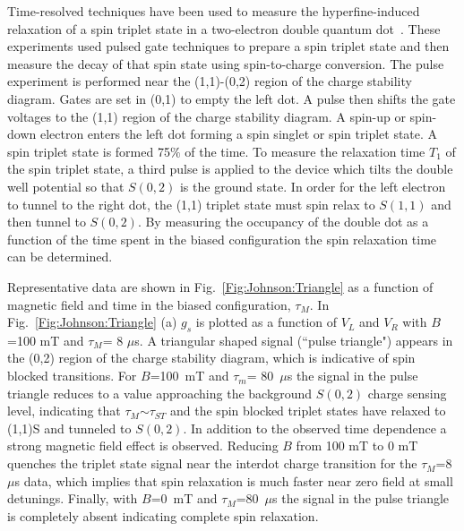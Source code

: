 \documentclass[12pt,aps,nofootinbib]{revtex4-1}
\begin{document}
Time-resolved techniques have been used to measure the hyperfine-induced relaxation
of a spin triplet state in a two-electron double quantum
dot~\cite{Petta_ST,johnson05}. These experiments used pulsed gate
techniques to prepare a spin triplet state and then measure the
decay of that spin state using spin-to-charge conversion. The
pulse experiment is performed near the (1,1)-(0,2) region of the
charge stability diagram. Gates are set in (0,1) to empty the left
dot. A pulse then shifts the gate voltages to the (1,1) region of
the charge stability diagram. A spin-up or spin-down electron
enters the left dot forming a spin singlet or spin triplet state.
A spin triplet state is formed 75$\%$ of the time. To measure the relaxation time $T_1$ of the spin triplet state, a
third pulse is applied to the device which tilts the double well
potential so that $S(0,2)$ is the ground state. In order for the
left electron to tunnel to the right dot, the (1,1) triplet state
must spin relax to $S(1,1)$ and then tunnel to $S(0,2)$. By
measuring the occupancy of the double dot as a function of the
time spent in the biased configuration the spin relaxation time can be
determined.

Representative data are shown in Fig.\ \ref{Fig:Johnson:Triangle}
as a function of magnetic field and time in the biased
configuration, $\tau_M$. In Fig.\ \ref{Fig:Johnson:Triangle} (a)
$g_s$ is plotted as a function of $V_L$ and $V_R$ with $B$=100 mT
and $\tau_M$= 8 $\mu$s. A triangular shaped signal (``pulse
triangle") appears in the (0,2) region of the charge stability
diagram, which is indicative of spin blocked transitions. For
$B$=100~mT and $\tau_m$= 80~$\mu$s the signal in the pulse
triangle reduces to a value approaching the background $S(0,2)$
charge sensing level, indicating that $\tau_M$$\sim$$\tau_{ST}$
and the spin blocked triplet states have relaxed to (1,1)S and
tunneled to $S(0,2)$. In addition to the observed time dependence
a strong magnetic field effect is observed. Reducing $B$ from 100
mT to 0 mT quenches the triplet state signal near the interdot
charge transition for the $\tau_M$=8~$\mu$s data, which implies
that spin relaxation is much faster near zero field at small
detunings. Finally, with $B$=0~mT and $\tau_M$=80~$\mu$s the
signal in the pulse triangle is completely absent indicating
complete spin relaxation.
\end{document}
